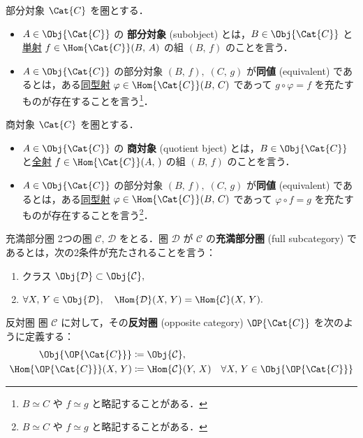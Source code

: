 \documentclass[algtopo_main]{subfiles}
\begin{document}
\begin{mydef}[label=def:sub]{部分対象}
    $\Cat{C}$ を圏とする．
    \begin{itemize}
        \item $A \in \Obj{\Cat{C}}$ の \textbf{部分対象} (subobject) とは，$B \in \Obj{\Cat{C}}$ と\hyperref[def:mono-epi]{単射} $f \in \Hom{\Cat{C}}(B,\, A)$ の組 $(B,\, f)$ のことを言う．
        \item $A \in \Obj{\Cat{C}}$ の部分対象 $(B,\, f),\; (C,\, g)$ が\textbf{同値} (equivalent) であるとは，ある\hyperref[def:isomorphism]{同型射} $\varphi \in \Hom{\Cat{C}} (B,\, C)$ であって $g \circ \varphi = f$ を充たすものが存在することを言う\footnote{$B \simeq C$ や $f \simeq g$ と略記することがある．}．
    \end{itemize}
\end{mydef}

\begin{mydef}[label=def:quo]{商対象}
    $\Cat{C}$ を圏とする．
    \begin{itemize}
        \item $A \in \Obj{\Cat{C}}$ の \textbf{商対象} (quotient bject) とは，$B \in \Obj{\Cat{C}}$ と\hyperref[def:mono-epi]{全射} $f \in \Hom{\Cat{C}}(A,\, )$ の組 $(B,\, f)$ のことを言う．
        \item $A \in \Obj{\Cat{C}}$ の部分対象 $(B,\, f),\; (C,\, g)$ が\textbf{同値} (equivalent) であるとは，ある\hyperref[def:isomorphism]{同型射} $\varphi \in \Hom{\Cat{C}} (B,\, C)$ であって $\varphi \circ f = g$ を充たすものが存在することを言う\footnote{$B \simeq C$ や $f \simeq g$ と略記することがある．}．
    \end{itemize}
\end{mydef}

\begin{mydef}[label=def:fullsub]{充満部分圏}
    2つの圏 $\mathcal{C},\, \mathcal{D}$ をとる．圏 $\mathcal{D}$ が $\mathcal{C}$ の\textbf{充満部分圏} (full subcategory) であるとは，次の2条件が充たされることを言う：
    \begin{enumerate}
        \item クラス $\Obj{\mathcal{D}} \subset \Obj{\mathcal{C}},$
        \item $\forall X,\, Y \in \Obj{\mathcal{D}},\quad \Hom{\mathcal{D}}(X,\, Y) = \Hom{\mathcal{C}}(X,\, Y).$
    \end{enumerate}
\end{mydef}

\begin{mydef}[label=def:opcategory]{反対圏}
    圏 $\mathcal{C}$ に対して，その\textbf{反対圏} (opposite category) $\OP{\Cat{C}}$ を次のように定義する：
    \begin{align}
        \Obj{\OP{\Cat{C}}} &\coloneqq \Obj{\mathcal{C}}, \\
        \Hom{\OP{\Cat{C}}}(X,\, Y) &\coloneqq \Hom{\mathcal{C}}(Y,\, X)\quad \forall X,\, Y \in \Obj{\OP{\Cat{C}}}
    \end{align}
\end{mydef}
\end{document}
